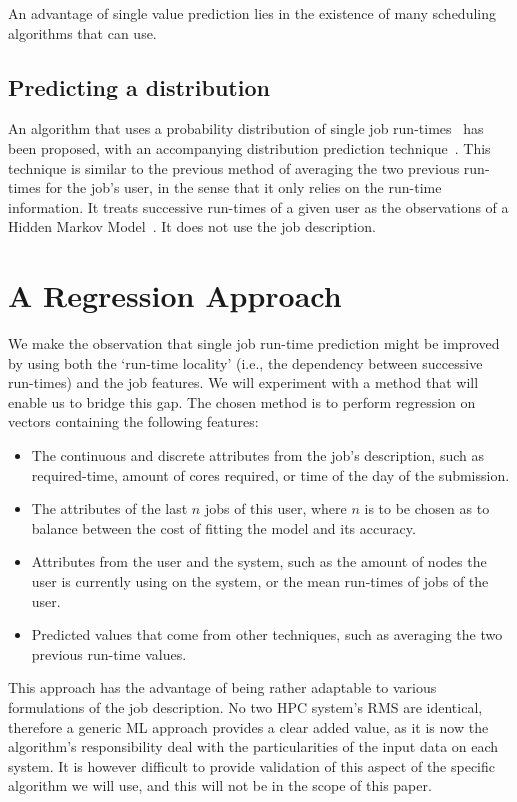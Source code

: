 \documentclass{article}
\begin{document}
  An advantage of single value prediction lies in the existence of many scheduling algorithms that can use.


  \subsection{Predicting a distribution}
  \label{sub:predicting_a_distribution}

  An algorithm that uses a probability distribution of single job run-times~\cite{probabilistic-backfilling} has been proposed, with an accompanying distribution prediction technique~\cite{hmm}. This technique is similar to the previous method of averaging the two previous run-times for the job's user, in the sense that it only relies on the run-time information. It treats successive run-times of a given user as the observations of a Hidden Markov Model~\cite{rabiner}. It does not use the job description.

  \section{A Regression Approach}
  \label{sec:our_approach}
  We make the observation that single job run-time prediction might be improved by using both the `run-time locality' (i.e., the dependency between successive run-times) and the job features. We will experiment with a method that will enable us to bridge this gap.
  The chosen method is to perform regression on vectors containing the following features:
  \begin{itemize}
    \item The continuous and discrete attributes from the job's description, such as required-time, amount of cores required, or time of the day of the submission.
    \item The attributes of the last $n$ jobs of this user, where $n$ is to be chosen as to balance between the cost of fitting the model and its accuracy.
    \item Attributes from the user and the system, such as the amount of nodes the user is currently using on the system, or the mean run-times of jobs of the user.
    \item Predicted values that come from other techniques, such as averaging the two previous run-time values.
  \end{itemize}
  This approach has the advantage of being rather adaptable to various formulations of the job description.
  No two HPC system's RMS are identical, therefore a generic ML approach provides a clear added value, as it is now the algorithm's responsibility deal with the particularities of the input data on each system.
  It is however difficult to provide validation of this aspect of the specific algorithm we will use, and this will not be in the scope of this paper.
\end{document}

